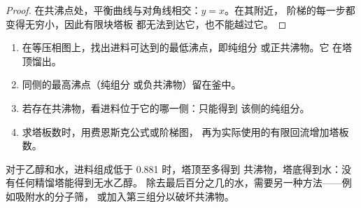 \begin{proof}
在共沸点处，平衡曲线与对角线相交：$y = x$。在其附近，
阶梯的每一步都变得无穷小，因此有限块塔板
都无法到达它，也不能越过它。
\end{proof}

\begin{method}[预测分馏结果]\label{met:b2:liquid-vapour-diagrams:predict-distillation}
\begin{enumerate}
  \item 在等压相图上，找出进料可达到的最低沸点，即纯组分
        或正共沸物。它
        在塔顶馏出。
  \item 同侧的最高沸点（纯组分
        或负共沸物）留在釜中。
  \item 若存在共沸物，看进料位于它的哪一侧：只能得到
        该侧的纯组分。
  \item 求塔板数时，用费恩斯克公式或阶梯图，
        再为实际使用的有限回流增加塔板数。
\end{enumerate}
\end{method}

对于乙醇和水，进料组成低于 0.881 时，塔顶至多得到
共沸物，塔底得到水：没有任何精馏塔能得到无水乙醇。
除去最后百分之几的水，需要另一种方法——例如吸附水的分子筛，
或加入第三组分以破坏共沸物。


